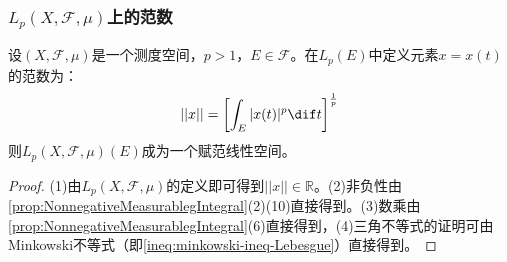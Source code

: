 \subsubsection{$L_p(X,\mathscr{F},\mu)$上的范数}
\begin{definition}
	设$(X,\mathscr{F},\mu)$是一个测度空间，$p>1$，$E\in\mathscr{F}$。在$L_p(E)$中定义元素$x=x(t)$的范数为：
	\begin{equation*}
		||x||=\left[\int_{E}^{}|x(t)|^p\dif t\right]^\frac{1}{p}
	\end{equation*}
	则$L_p(X,\mathscr{F},\mu)(E)$成为一个赋范线性空间。
\end{definition}
\begin{proof}
	(1)由$L_p(X,\mathscr{F},\mu)$的定义即可得到$||x||\in\mathbb{R}$。(2)非负性由\cref{prop:NonnegativeMeasurablegIntegral}(2)(10)直接得到。(3)数乘由\cref{prop:NonnegativeMeasurablegIntegral}(6)直接得到，(4)三角不等式的证明可由Minkowski不等式（即\cref{ineq:minkowski-ineq-Lebesgue}）直接得到。
\end{proof}

